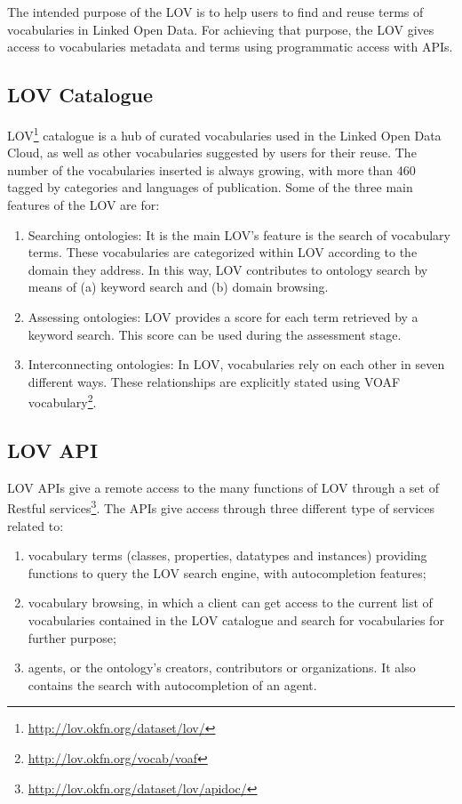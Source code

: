 The intended purpose of the LOV \cite{vandenbusschelov} is to help users to find and reuse terms of vocabularies in Linked Open Data. For achieving that purpose, the LOV gives access to vocabularies metadata and terms using programmatic access with APIs. 
\subsection{LOV Catalogue} 
LOV\footnote{\url{http://lov.okfn.org/dataset/lov/}} catalogue  is a hub of curated vocabularies used in the Linked Open Data Cloud, as well as other vocabularies suggested by users for their reuse. The number of the vocabularies inserted is always growing, with more than 460 tagged by categories and languages of publication. Some of the three main features of the LOV are for:
\begin{enumerate}
\item Searching ontologies: It is the main LOV's feature is the search of vocabulary terms. These vocabularies are categorized within LOV according to the domain they address. In this way, LOV contributes to ontology search by means of (a) keyword search and (b) domain browsing.
 \item Assessing ontologies: LOV provides a score for each term retrieved by a keyword search. This score can be used during the assessment stage.
 \item Interconnecting ontologies: In LOV, vocabularies rely on each other in seven different ways. These relationships are explicitly stated using VOAF vocabulary\footnote{\url{http://lov.okfn.org/vocab/voaf}}. 
\end{enumerate}
 

\subsection{LOV API}
LOV APIs give a remote access to the many functions of LOV through a set of Restful services\footnote{\url{http://lov.okfn.org/dataset/lov/apidoc/}}. %
The APIs give access through three different type of services related to:
\begin{enumerate} 
	\item vocabulary terms (classes, properties, datatypes and instances) providing functions to query the LOV search engine, with autocompletion features;
	\item vocabulary browsing, in which a client can get access to the current list of vocabularies contained in the LOV catalogue and search for vocabularies for further purpose;
	\item agents, or the ontology's creators, contributors or organizations. It also contains the search with autocompletion of an agent.
	\end{enumerate}


